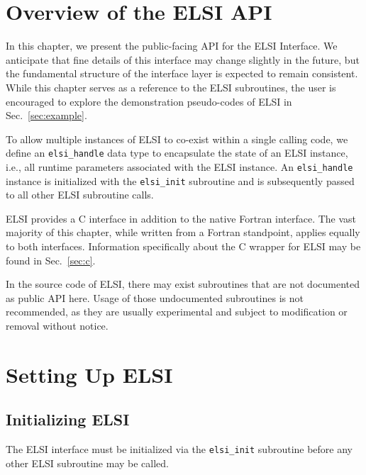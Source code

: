 \documentclass{report}
\begin{document}
\section{Overview of the ELSI API}
\label{sec:api}
In this chapter, we present the public-facing API for the ELSI Interface. We anticipate that fine details of this interface may change slightly in the future, but the fundamental structure of the interface layer is expected to remain consistent. While this chapter serves as a reference to the ELSI subroutines, the user is encouraged to explore the demonstration pseudo-codes of ELSI in Sec.~\ref{sec:example}.

To allow multiple instances of ELSI to co-exist within a single calling code, we define an \texttt{elsi\_handle} data type to encapsulate the state of an ELSI instance, i.e., all runtime parameters associated with the ELSI instance. An \texttt{elsi\_handle} instance is initialized with the \texttt{elsi\_init} subroutine and is subsequently passed to all other ELSI subroutine calls.

ELSI provides a C interface in addition to the native Fortran interface. The vast majority of this chapter, while written from a Fortran standpoint, applies equally to both interfaces. Information specifically about the C wrapper for ELSI may be found in Sec.~\ref{sec:c}.

In the source code of ELSI, there may exist subroutines that are not documented as public API here. Usage of those undocumented subroutines is not recommended, as they are usually experimental and subject to modification or removal without notice.

\section{Setting Up ELSI}
\label{sec:setup}
\subsection{Initializing ELSI}
\label{subsec:setup_init}
The ELSI interface must be initialized via the \texttt{elsi\_init} subroutine before any other ELSI subroutine may be called.
\end{document}
